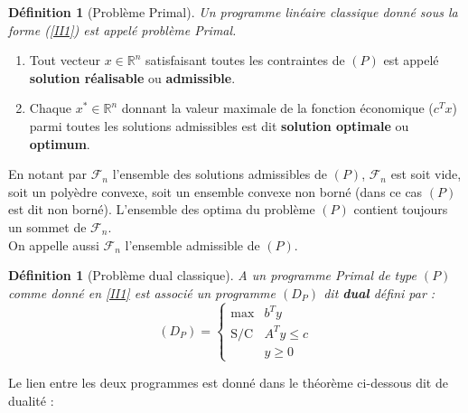\documentclass[11pt]{report}
\newenvironment{boxdefinition}
{\begin{tcolorbox}
		[enhanced jigsaw,breakable,pad at break*=1mm,
		colback=black!5!white,boxrule=0pt,frame hidden,
		borderline west={1.5mm}{-2mm}{blue}]}
	{\end{tcolorbox}}
\theoremstyle{styletheorem}
\theoremstyle{styledef}
\newtheorem{definitions}[theoreme]{Définition}
\theoremstyle{remark}
\newenvironment{definition}{\vspace*{0.3cm}\begin{boxdefinition}\begin{definitions}}{\end{definitions}\end{boxdefinition}\vspace*{0.3cm}}
\newcommand{\R}{\ensuremath{\mathbb{R}}}
\newcommand{\Fr}{\ensuremath{\mathcal{F}}  }
\begin{document}
\begin{definition}[Problème Primal]
	Un programme linéaire classique donné sous la forme (\ref{II1}) est appelé problème Primal.
\end{definition}
\begin{enumerate}[label = $\bullet$]
	
	\item Tout vecteur $x\in \R^n$ satisfaisant toutes les contraintes de $(P)$ est appelé \textbf{solution réalisable}  ou \textbf{admissible}.
	
	\item Chaque $x^* \in \R^n$ donnant la valeur maximale de la fonction économique ($c^Tx$) parmi toutes les solutions admissibles est dit \textbf{solution optimale} ou \textbf{optimum}.
\end{enumerate}
En notant par $\mathcal{F}_n$ l'ensemble des solutions admissibles de $(P)$, $\mathcal{F}_n$ est soit vide, soit un polyèdre convexe, soit un ensemble convexe non borné (dans ce cas $(P)$ est dit non borné). L'ensemble des optima du problème $(P)$ contient toujours un sommet de $\mathcal{F}_n$.\\
On appelle aussi $\Fr_n$ l'ensemble admissible de $(P)$.\\

\begin{definition}[Problème dual classique]
	A un programme Primal de type $(P)$ comme donné en \ref{II1} est associé un programme $(D_P)$ dit \textbf{dual} défini par :
	\begin{equation}\label{II2}
		(D_P) = \left \lbrace \begin{array}{ll}
			\text{max}& b^T y\\
			\text{S/C} & A^T y\leq c\\
			& y\geq 0
		\end{array}\right.
	\end{equation}
\end{definition}


Le lien entre les deux programmes est donné dans le théorème ci-dessous dit de dualité :  \\
\end{document}
